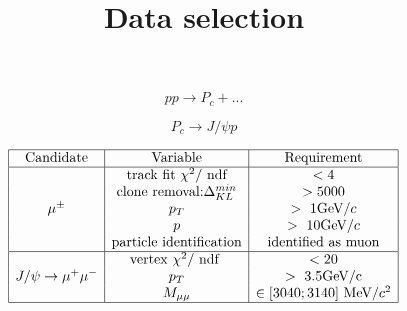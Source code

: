 \documentclass[11pt, oneside]{article}   	%
\title{Data selection}
\author{ }
\begin{document}
\maketitle
$$
pp\rightarrow P_c +...
$$

$$
P_c\rightarrow J/\psi p
$$



$$
\begin{array}{|c|c|c|}
\hline 

\text{Candidate} & \text{Variable} & \text{Requirement} \\

\hline

{} & {\text { track fit } \chi^{2} / \text { ndf }} & {<4} \\
{} & {\text{clone removal:} \Delta_{KL}^{min}} & {>5000} \\
{\mu^{\pm}} & p_T & >\text{ 1GeV}/c \\
{} & p & >\text{ 10GeV}/c \\
{} & {\text{particle identification}} & \text{identified as muon}\\

\hline

{} & {\text{vertex } \chi^{2}/\text { ndf }} & <\text{20}\\
J/\psi\space \rightarrow \mu^{+} \mu^{-} & {p_T} & >\text{ 3.5GeV/c}\\
{} & M_{\mu\mu} & \in[3040;3140] \text{ MeV}/c^2 \\

\hline







\end{array}
$$
\end{document}
